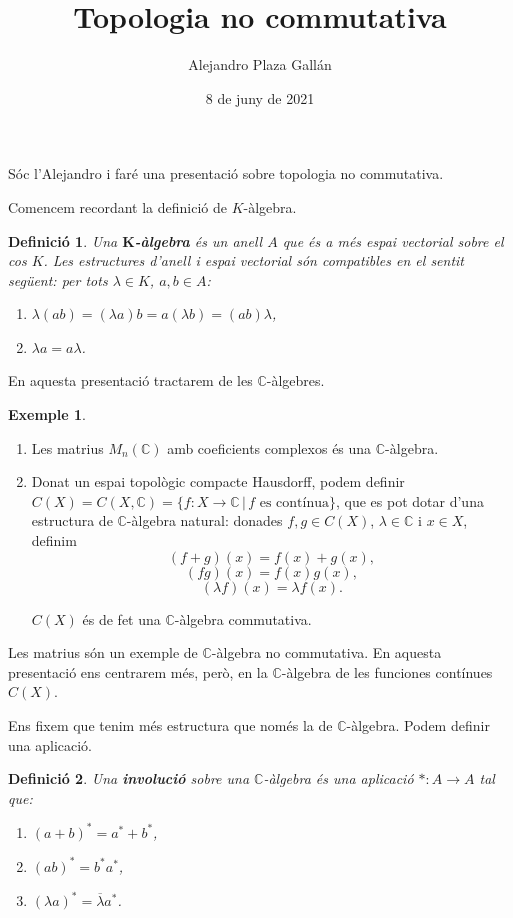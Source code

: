 \documentclass{article}
\title{Topologia no commutativa}
\author{Alejandro Plaza Gall\'{a}n}
\date{8 de juny de 2021}
\newtheorem{definicio}{Definici\'{o}}
\theoremstyle{definition}
\newtheorem{exemple}{Exemple}
\begin{document}
\maketitle

S\'{o}c l'Alejandro i far\'{e} una presentaci\'{o} sobre topologia no commutativa.

Comencem recordant la definici\'{o} de $K$-\`{a}lgebra.
\begin{definicio}
Una $\boldsymbol{K}$\textbf{-\`{a}lgebra} \'{e}s un anell $A$ que \'{e}s a m\'{e}s espai vectorial sobre el cos $K$. Les estructures d'anell i espai vectorial s\'{o}n compatibles en el sentit seg\"{u}ent: per tots $\lambda\in K$, $a,b\in A$:
\begin{enumerate}
\item $\lambda(ab)=(\lambda a)b=a(\lambda b)=(ab)\lambda$,
\item $\lambda a=a\lambda$.
\end{enumerate}
\end{definicio}

En aquesta presentaci\'{o} tractarem de les $\mathbb{C}$-\`{a}lgebres.

\begin{exemple}
\begin{enumerate}
\item Les matrius $M_n(\mathbb{C})$ amb coeficients complexos \'{e}s una $\mathbb{C}$-\`{a}lgebra.
\item Donat un espai topol\`{o}gic compacte Hausdorff, podem definir $C(X)=C(X,\mathbb{C})=\{f:X\rightarrow\mathbb{C}\,|\,f\text{ es cont\'{i}nua}\}$, que es pot dotar d'una estructura de $\mathbb{C}$-\`{a}lgebra natural: donades $f,g\in C(X)$, $\lambda\in\mathbb{C}$ i $x\in X$, definim
\[(f+g)(x)=f(x)+g(x),\]
\[(fg)(x)=f(x)g(x),\]
\[(\lambda f)(x)=\lambda f(x).\]

$C(X)$ \'{e}s de fet una $\mathbb{C}$-\`{a}lgebra commutativa.
\end{enumerate}
\end{exemple}

Les matrius s\'{o}n un exemple de $\mathbb{C}$-\`{a}lgebra no commutativa. En aquesta presentaci\'{o} ens centrarem m\'{e}s, per\`{o}, en la $\mathbb{C}$-\`{a}lgebra de les funciones cont\'{i}nues $C(X)$.

Ens fixem que tenim m\'{e}s estructura que nom\'{e}s la de $\mathbb{C}$-\`{a}lgebra. Podem definir una aplicaci\'{o}.

\begin{definicio}
Una \textbf{involuci\'{o}} sobre una $\mathbb{C}$-\`{a}lgebra \'{e}s una aplicaci\'{o} $*:A\rightarrow A$ tal que:
\begin{enumerate}
\item $(a+b)^*=a^*+b^*$,
\item $(ab)^*=b^*a^*$,
\item $(\lambda a)^*=\overline\lambda a^*$.
\end{enumerate}
\end{definicio}
\end{document}
